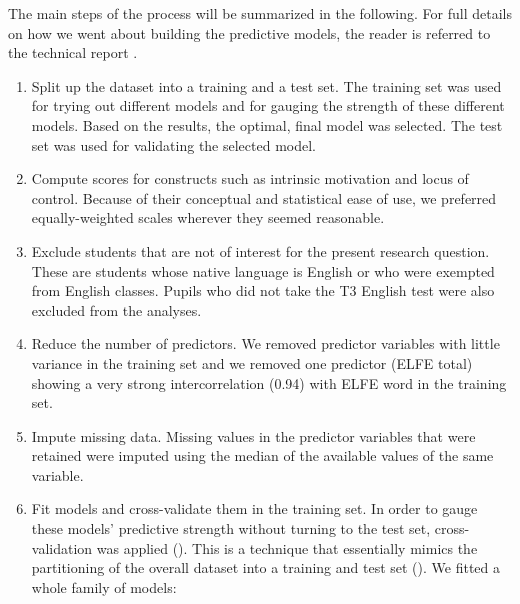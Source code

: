 \documentclass[output=paper]{langsci/langscibook}
\begin{document}
The main steps of the process will be summarized in the following. For full details on how we went about building the predictive models, the reader is referred to the technical report \citep{Vanhove2021}. 

\begin{enumerate}
\item Split up the dataset into a training and a test set. The training set was used for trying out different models and for gauging the strength of these different models. Based on the results, the optimal, final model was selected. The test set was used for validating the selected model.
\item Compute scores for constructs such as intrinsic motivation and locus of control. Because of their conceptual and statistical ease of use, we preferred equally-weighted scales wherever they seemed reasonable.
\item Exclude students that are not of interest for the present research question. These are students whose native language is English or who were exempted from English classes. Pupils who did not take the T3 English test were also excluded from the analyses.
\item Reduce the number of predictors. We removed predictor variables with little variance in the training set and we removed one predictor (ELFE total) showing a very strong intercorrelation (0.94) with ELFE word in the training set.
\item Impute missing data. Missing values in the predictor variables that were retained were imputed using the median of the available values of the same variable.
\item Fit models and cross-validate them in the training set. In order to gauge these models’ predictive strength without turning to the test set, cross-validation was applied (). This is a technique that essentially mimics the partitioning of the overall dataset into a training and test set (). We fitted a whole family of models:


\end{enumerate}
\end{document}
